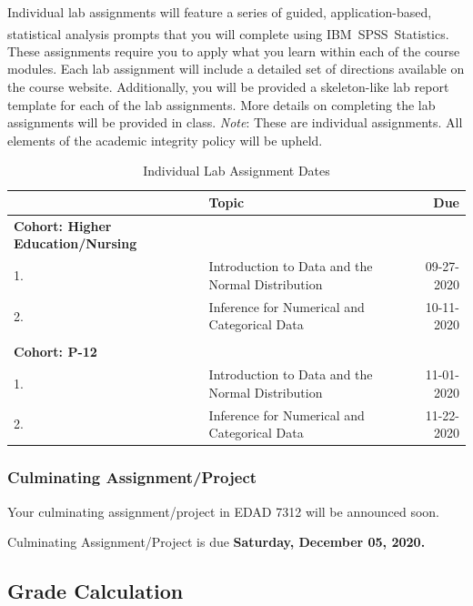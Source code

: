 \documentclass[
]{article}
\begin{document}
Individual lab assignments will feature a series of guided,
application-based, statistical analysis prompts that you will complete
using
IBM\textsuperscript{\textregistered}~SPSS\textsuperscript{\textregistered}~Statistics.
These assignments require you to apply what you learn within each of the
course modules. Each lab assignment will include a detailed set of
directions available on the course website. Additionally, you will be
provided a skeleton-like lab report template for each of the lab
assignments. More details on completing the lab assignments will be
provided in class. \emph{Note}: These are individual assignments. All
elements of the academic integrity policy will be upheld.

\begin{table}[H]
\begin{center}
\caption{Individual Lab Assignment Dates}
\label{labs}
\vspace{3mm}
\begin{tabular}{llr}
\hline
 & {\bf{Topic}} & {\bf{Due}}\\
\hline
\textbf{Cohort: Higher Education/Nursing} & \\
1. & Introduction to Data and the Normal Distribution & 09-27-2020\\
2. & Inference for Numerical and Categorical Data & 10-11-2020\\
& & \\
\textbf{Cohort: P-12} & \\
1. & Introduction to Data and the Normal Distribution & 11-01-2020\\
2. & Inference for Numerical and Categorical Data & 11-22-2020\\
\hline
\end{tabular}
\end{center}
\end{table}

\subsubsection{Culminating Assignment/Project}

Your culminating assignment/project in EDAD 7312 will be announced soon.

Culminating Assignment/Project is due \textbf{Saturday, December 05,
2020.}

\subsection{Grade Calculation}
\end{document}
